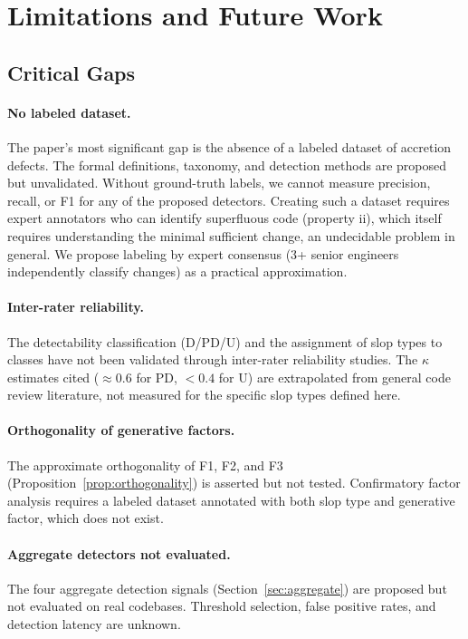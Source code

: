 \documentclass[11pt, a4paper, copyright]{googledeepmind}
\begin{document}
\section{Limitations and Future Work}
\label{sec:limitations}

\subsection{Critical Gaps}

\paragraph{No labeled dataset.} The paper's most significant gap is the absence of a labeled dataset of accretion defects. The formal definitions, taxonomy, and detection methods are proposed but unvalidated. Without ground-truth labels, we cannot measure precision, recall, or F1 for any of the proposed detectors. Creating such a dataset requires expert annotators who can identify superfluous code (property ii), which itself requires understanding the minimal sufficient change, an undecidable problem in general. We propose labeling by expert consensus (3+ senior engineers independently classify changes) as a practical approximation.

\paragraph{Inter-rater reliability.} The detectability classification (D/PD/U) and the assignment of slop types to classes have not been validated through inter-rater reliability studies. The $\kappa$ estimates cited ($\approx 0.6$ for PD, $< 0.4$ for U) are extrapolated from general code review literature, not measured for the specific slop types defined here.

\paragraph{Orthogonality of generative factors.} The approximate orthogonality of F1, F2, and F3 (Proposition~\ref{prop:orthogonality}) is asserted but not tested. Confirmatory factor analysis requires a labeled dataset annotated with both slop type and generative factor, which does not exist.

\paragraph{Aggregate detectors not evaluated.} The four aggregate detection signals (Section~\ref{sec:aggregate}) are proposed but not evaluated on real codebases. Threshold selection, false positive rates, and detection latency are unknown.
\end{document}
